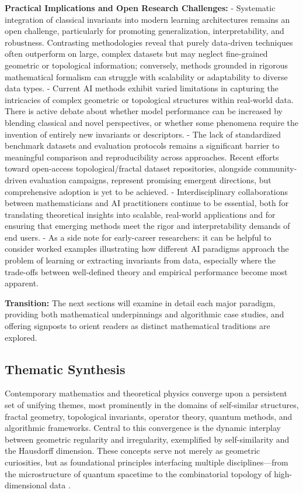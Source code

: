\documentclass[sigconf]{acmart}
\begin{document}
\textbf{Practical Implications and Open Research Challenges:}
- Systematic integration of classical invariants into modern learning architectures remains an open challenge, particularly for promoting generalization, interpretability, and robustness. Contrasting methodologies reveal that purely data-driven techniques often outperform on large, complex datasets but may neglect fine-grained geometric or topological information; conversely, methods grounded in rigorous mathematical formalism can struggle with scalability or adaptability to diverse data types.
- Current AI methods exhibit varied limitations in capturing the intricacies of complex geometric or topological structures within real-world data. There is active debate about whether model performance can be increased by blending classical and novel perspectives, or whether some phenomena require the invention of entirely new invariants or descriptors.
- The lack of standardized benchmark datasets and evaluation protocols remains a significant barrier to meaningful comparison and reproducibility across approaches. Recent efforts toward open-access topological/fractal dataset repositories, alongside community-driven evaluation campaigns, represent promising emergent directions, but comprehensive adoption is yet to be achieved.
- Interdisciplinary collaborations between mathematicians and AI practitioners continue to be essential, both for translating theoretical insights into scalable, real-world applications and for ensuring that emerging methods meet the rigor and interpretability demands of end users.
- As a side note for early-career researchers: it can be helpful to consider worked examples illustrating how different AI paradigms approach the problem of learning or extracting invariants from data, especially where the trade-offs between well-defined theory and empirical performance become most apparent.

\textbf{Transition:} The next sections will examine in detail each major paradigm, providing both mathematical underpinnings and algorithmic case studies, and offering signposts to orient readers as distinct mathematical traditions are explored.

\subsection{Thematic Synthesis}

Contemporary mathematics and theoretical physics converge upon a persistent set of unifying themes, most prominently in the domains of self-similar structures, fractal geometry, topological invariants, operator theory, quantum methods, and algorithmic frameworks. Central to this convergence is the dynamic interplay between geometric regularity and irregularity, exemplified by self-similarity and the Hausdorff dimension. These concepts serve not merely as geometric curiosities, but as foundational principles interfacing multiple disciplines—from the microstructure of quantum spacetime to the combinatorial topology of high-dimensional data \cite{ref5,ref7,ref8,ref10,ref11,ref19,ref20,ref22,ref24,ref25,ref26,ref30,ref35,ref36,ref37,ref38,ref39,ref40,ref51,ref54,ref55,ref56,ref57,ref58,ref59,ref60,ref61,ref62,ref63,ref64,ref65}.
\end{document}
